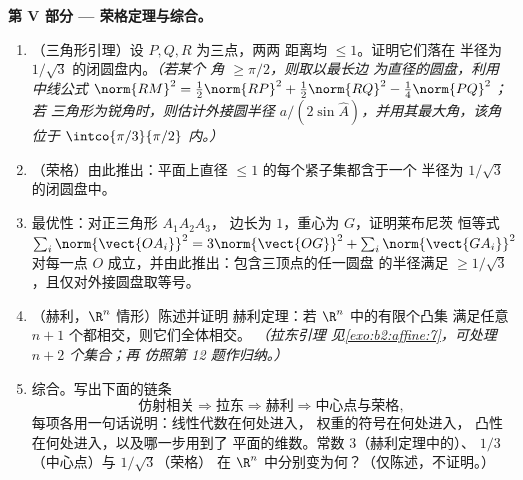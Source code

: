 \begin{problem}
\medskip
\noindent\textbf{第 V 部分 --- 荣格定理与综合。}
\begin{enumerate}[resume]
  \item （三角形引理）设 $P, Q, R$ 为三点，两两
        距离均 $\leq 1$。证明它们落在
        半径为 $1/\sqrt3$ 的闭圆盘内。\emph{（若某个
        角 $\geq \pi/2$，则取以最长边
        为直径的圆盘，利用中线公式
        $\norm{RM}^2 = \tfrac12\norm{RP}^2 +
        \tfrac12\norm{RQ}^2 - \tfrac14\norm{PQ}^2$；若
        三角形为锐角时，则估计外接圆半径 $a/(2\sin
        \widehat A)$，并用其最大角，该角位于
        $\intco{\pi/3}{\pi/2}$ 内。）}
  \item （荣格）由此推出：平面上直径
        $\leq 1$ 的每个紧子集都含于一个
        半径为 $1/\sqrt3$ 的闭圆盘中。
  \item 最优性：对正三角形 $A_1A_2A_3$，
        边长为 $1$，重心为 $G$，证明莱布尼茨
        恒等式 $\sum_i \norm{\vect{OA_i}}^2 =
        3\norm{\vect{OG}}^2 + \sum_i \norm{\vect{GA_i}}^2$
        对每一点 $O$ 成立，并由此推出：包含三顶点的任一圆盘
        的半径满足 $\geq
        1/\sqrt3$，且仅对外接圆盘取等号。
  \item （赫利，$\R^n$ 情形）陈述并证明
        赫利定理：若 $\R^n$ 中的有限个凸集
        满足任意 $n + 1$ 个都相交，则它们全体相交。
        \emph{（拉东引理
        见\cref{exo:b2:affine:7}，可处理 $n + 2$ 个集合；再
        仿照第 12 题作归纳。）}
  \item 综合。写出下面的链条
        \[
        \text{仿射相关} \Rightarrow \text{拉东}
        \Rightarrow \text{赫利} \Rightarrow
        \text{中心点与荣格},
        \]
        每项各用一句话说明：线性代数在何处进入，
        权重的符号在何处进入，
        凸性在何处进入，以及哪一步用到了
        平面的维数。常数 $3$（赫利定理中的）、
        $1/3$（中心点）与 $1/\sqrt3$（荣格）
        在 $\R^n$ 中分别变为何？（仅陈述，不证明。）
\end{enumerate}
\end{problem}
